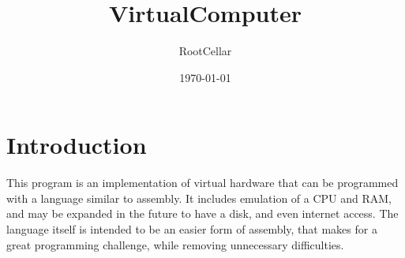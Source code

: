 \documentclass[12t]{article}
\title{VirtualComputer}
\author{RootCellar}
\date{\today}
\begin{document}
\maketitle

\section{Introduction}

This program is an implementation of virtual hardware that can be programmed with a language similar to assembly.
It includes emulation of a CPU and RAM, and may be expanded in the future to have a disk, and even internet access.
The language itself is intended to be an easier form of assembly, that makes for a great programming challenge, while
removing unnecessary difficulties.
\end{document}
